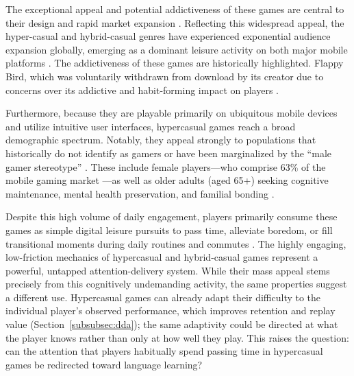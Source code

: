     The exceptional appeal and potential addictiveness of these games are central to their design and rapid market expansion \cite{pizzo2023hypercasual}. Reflecting this widespread appeal, the hyper-casual and hybrid-casual genres have experienced exponential audience expansion globally, emerging as a dominant leisure activity on both major mobile platforms \cite{businessresearch2026Hypercasualgaming}. The addictiveness of these games are historically highlighted. Flappy Bird, which was voluntarily withdrawn from download by its creator due to concerns over its addictive and habit-forming impact on players \cite{pizzo2023hypercasual}.

    Furthermore, because they are playable primarily on ubiquitous mobile devices and utilize intuitive user interfaces, hypercasual games reach a broad demographic spectrum. Notably, they appeal strongly to populations that historically do not identify as gamers or have been marginalized by the ``male gamer stereotype'' \cite{Paassen2017WhatIA}. These include female players---who comprise 63\% of the mobile gaming market \cite{anderton2020hypercasual}---as well as older adults (aged 65+) seeking cognitive maintenance, mental health preservation, and familial bonding \cite{celatti2022seniorgamers}.

    Despite this high volume of daily engagement, players primarily consume these games as simple digital leisure pursuits to pass time, alleviate boredom, or fill transitional moments during daily routines and commutes \cite{Zelevskaya2022thesis, pizzo2023hypercasual}. The highly engaging, low-friction mechanics of hypercasual and hybrid-casual games represent a powerful, untapped attention-delivery system. While their mass appeal stems precisely from this cognitively undemanding activity, the same properties suggest a different use. Hypercasual games can already adapt their difficulty to the individual player's observed performance, which improves retention and replay value \cite{yang2020hyper} (Section~\ref{subsubsec:dda}); the same adaptivity could be directed at what the player knows rather than only at how well they play. This raises the question: can the attention that players habitually spend passing time in hypercasual games be redirected toward language learning?
    

    
